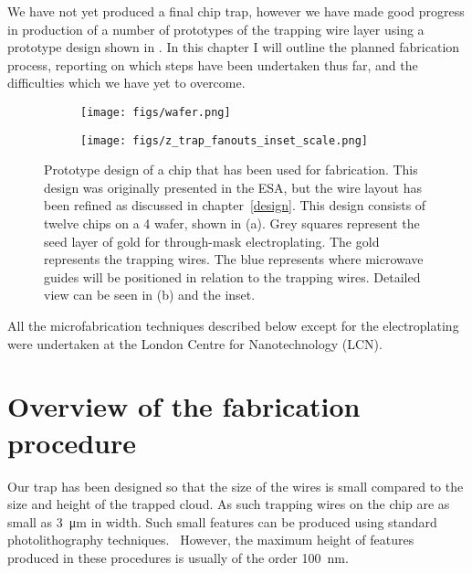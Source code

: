 We have not yet produced a final chip trap, however we have made good progress
in production of a number of prototypes of the trapping wire layer using a
prototype design shown in . In this chapter I will
outline the planned fabrication process, reporting on which steps have been
undertaken thus far, and the difficulties which we have yet to overcome.

\begin{figure}[h]
    \begin{subfigure}{.5\textwidth}
  \centering
      \texttt{[image: figs/wafer.png]}
      \caption{}
    \end{subfigure}
    \begin{subfigure}{.5\textwidth}
  \centering
      \texttt{[image: figs/z\_trap\_fanouts\_inset\_scale.png]}
      \caption{}
    \end{subfigure}
  \caption{
    Prototype design of a chip that has been used for fabrication. This design
    was originally presented in the ESA, but the wire layout has been refined
    as discussed in chapter~\ref{design}. This design consists of twelve chips
    on a \SI{4}{\inch} wafer, shown in (a). Grey squares represent the seed
    layer of gold for through-mask electroplating. The gold represents the
    trapping wires. The blue represents where microwave guides will be
    positioned in relation to the trapping wires. Detailed view can be seen in
    (b) and the inset.
  }
  \label{fab:fig:design1}
\end{figure}

All the microfabrication techniques described below except for the
electroplating were undertaken at the London Centre for Nanotechnology (LCN). 

\section{Overview of the fabrication procedure}

Our trap has been designed so that the size of the wires is small compared to
the size and height of the trapped cloud. As such trapping wires on the chip
are as small as \SI{3}{\micro\meter} in width. Such small features can be
produced using standard photolithography techniques.~\cite{Madou2002} However,
the maximum height of features produced in these procedures is usually of the
order \SI{100}{\nano\meter}.

